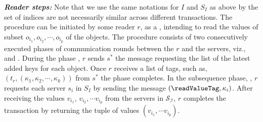 
\textit{\textbf{Reader steps:}}
Note that we use the same notations for $I$ and $S_I$ as above by the set of indices are not necessarily similar across different 
transactions.
The procedure   can be 
initiated by  some reader  $r$,   as a \rot{}, intending to read the values of 
subset $o_{i_1},  o_{i_2}, \cdots, o_{i_p}$ of the objects. The procedure 
consists of two consecutively executed phases of communication rounds
between the $r$ and the  servers, viz.,  {\getTagArray} and {\readValue}. 
%
During  the  phase {\getTagArray},  $r$ sends $s^*$ the message  {\getTagArrayTag}  
 requesting the  list of the latest added keys for each object. 
 Once $r$ receives a list of tags, such as, $(t_r, ({\kappa}_1, {\kappa}_2, \cdots,  {\kappa}_k))$ from $s^*$   the phase completes.
%
%
In the subsequence phase, {\readValue},   $r$ requests each server $s_i$ in $S_I$ by sending the message 
$(\text{\readValueTag}, \kappa_i)$. 
%
After  receiving the values $v_{i_1}$, $v_{i_2}, \cdots v_{i_p}$ from the servers in $\mathcal{S_I}$, 
 $r$ completes the transaction  by 
 returning the tuple of values $(v_{i_1}, \cdots v_{i_p})$.

